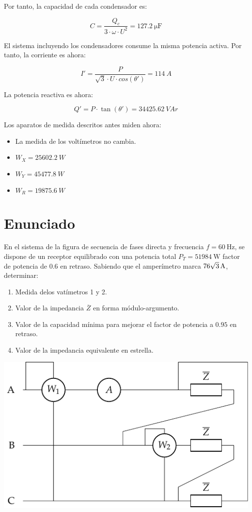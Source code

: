Por tanto, la capacidad de cada condensador es:

\[
  C = \frac{Q_c}{3 \cdot \omega \cdot U^2} = \SI{127.2}{\micro\farad}
\]

El sistema incluyendo los condensadores consume la misma potencia
activa. Por tanto, la corriente es ahora:

\[I' = \frac{P}{\sqrt{3} \cdot U \cdot cos(\theta')} = \SI{114}{A}\]

La potencia reactiva es ahora:

\[
  Q' = P \cdot \tan(\theta') = \SI{34425.62}{VAr}
\]

Los aparatos de medida descritos antes miden ahora:
\begin{itemize}
\item La medida de los voltímetros no cambia.
\item $W_X = \SI{25602.2}{W}$
\item $W_Y = \SI{45477.8}{W}$
\item $W_R = \SI{19875.6}{W}$
\end{itemize}


\section{Enunciado}

\begin{minipage}{0.595\textwidth}
  En el sistema de la figura de secuencia de fases directa y frecuencia
  $f=\qty{60}{\hertz}$, se dispone de un receptor equilibrado con una
  potencia total $P_T=\qty{51984}{\watt}$ factor de potencia de $0.6$ en
  retraso. Sabiendo que el amperímetro marca
  $\qty[parse-numbers=false]{76\sqrt{3}}{\ampere}$, determinar:
  \begin{enumerate}
  \item Medida delos vatímetros 1 y 2.
  \item Valor de la impedancia $\overline{Z}$ en forma módulo-argumento.
  \item Valor de la capacidad mínima para mejorar el factor de potencia
    a $0.95$ en retraso.
  \item Valor de la impedancia equivalente en estrella.
  \end{enumerate}
\end{minipage}
\begin{minipage}{0.395\textwidth}
    \includegraphics[width=\linewidth]{figuras/dosvat_triangulo.pdf}
\end{minipage}


